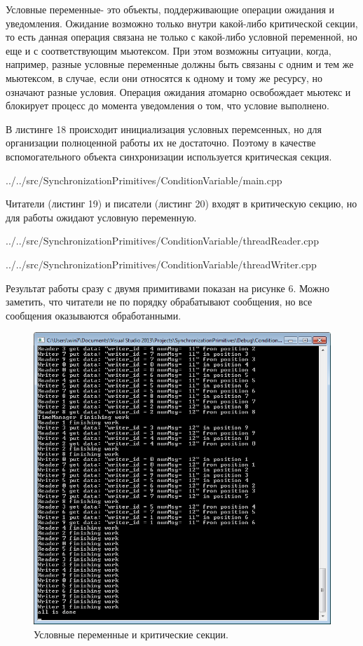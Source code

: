 \documentclass[a4paper, 12pt]{article}		%
\begin{document}
Условные переменные- это объекты, поддерживающие операции ожидания и уведомления. Ожидание возможно только внутри какой-либо критической секции, то есть данная операция связана не только с какой-либо условной переменной, но еще и с соответствующим мьютексом. При этом возможны ситуации, когда, например, разные условные переменные должны быть связаны с одним и тем же мьютексом, в случае, если они относятся к одному и тому же ресурсу, но означают разные условия. Операция ожидания атомарно освобождает мьютекс и блокирует процесс до момента уведомления о том, что условие выполнено.

В листинге 18 происходит инициализация условных перемсенных, но для организации полноценной работы их не достаточно. Поэтому в качестве вспомогательного объекта синхронизации используется критическая секция.


{../../src/SynchronizationPrimitives/ConditionVariable/main.cpp}

Читатели (листинг 19) и писатели (листинг 20) входят в критическую секцию, но для работы ожидают условную переменную.


{../../src/SynchronizationPrimitives/ConditionVariable/threadReader.cpp}


{../../src/SynchronizationPrimitives/ConditionVariable/threadWriter.cpp}
\newpage

Результат работы сразу с двумя примитивами показан на рисунке 6. Можно заметить, что читатели не по порядку обрабатывают сообщения, но все сообщения оказываются обработанными.

\begin{figure}[h!]
\centering
\includegraphics[scale=1]{res/005}
\caption{Условные переменные и критические секции.}
\end{figure}
\end{document}

